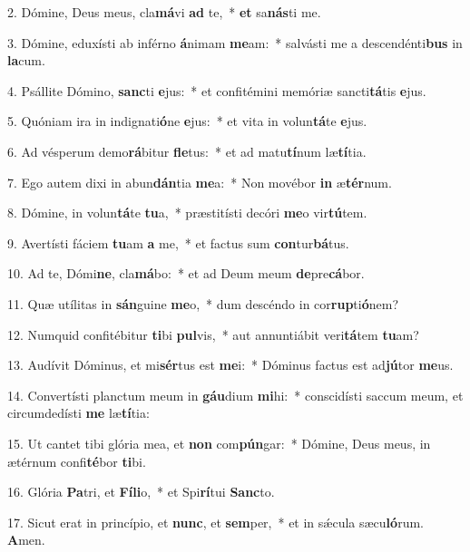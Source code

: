 2. Dómine, Deus meus, cla\textbf{má}vi \textbf{ad} te,~*  \textbf{et} sa\textbf{nás}ti me.\

3. Dómine, eduxísti ab inférno \textbf{á}nimam \textbf{me}am:~*  salvásti me a descendénti\textbf{bus} in \textbf{la}cum.\

4. Psállite Dómino, \textbf{sanc}ti \textbf{e}jus:~*  et confitémini memóriæ sancti\textbf{tá}tis \textbf{e}jus.\

5. Quóniam ira in indignati\textbf{ó}ne \textbf{e}jus:~*  et vita in volun\textbf{tá}te \textbf{e}jus.\

6. Ad vésperum demo\textbf{rá}bitur \textbf{fle}tus:~*  et ad matu\textbf{tí}num læ\textbf{tí}tia.\

7. Ego autem dixi in abun\textbf{dán}tia \textbf{me}a:~*  Non movébor \textbf{in} æ\textbf{tér}num.\

8. Dómine, in volun\textbf{tá}te \textbf{tu}a,~*  præstitísti decóri \textbf{me}o vir\textbf{tú}tem.\

9. Avertísti fáciem \textbf{tu}am \textbf{a} me,~*  et factus sum \textbf{con}tur\textbf{bá}tus.\

10. Ad te, Dómi\textbf{ne}, cla\textbf{má}bo:~*  et ad Deum meum \textbf{de}pre\textbf{cá}bor.\

11. Quæ utílitas in \textbf{sán}guine \textbf{me}o,~*  dum descéndo in cor\textbf{rup}ti\textbf{ó}nem?\

12. Numquid confitébitur \textbf{ti}bi \textbf{pul}vis,~*  aut annuntiábit veri\textbf{tá}tem \textbf{tu}am?\

13. Audívit Dóminus, et mi\textbf{sér}tus est \textbf{me}i:~*  Dóminus factus est ad\textbf{jú}tor \textbf{me}us.\

14. Convertísti planctum meum in \textbf{gáu}dium \textbf{mi}hi:~*  conscidísti saccum meum, et circumdedísti \textbf{me} læ\textbf{tí}tia:\

15. Ut cantet tibi glória mea, et \textbf{non} com\textbf{pún}gar:~*  Dómine, Deus meus, in ætérnum confi\textbf{té}bor \textbf{ti}bi.\

16. Glória \textbf{Pa}tri, et \textbf{Fí}\textbf{li}o,~*  et Spi\textbf{rí}tui \textbf{Sanc}to.\

17. Sicut erat in princípio, et \textbf{nunc}, et \textbf{sem}per,~*  et in sǽcula sæcu\textbf{ló}rum. \textbf{A}men.\

